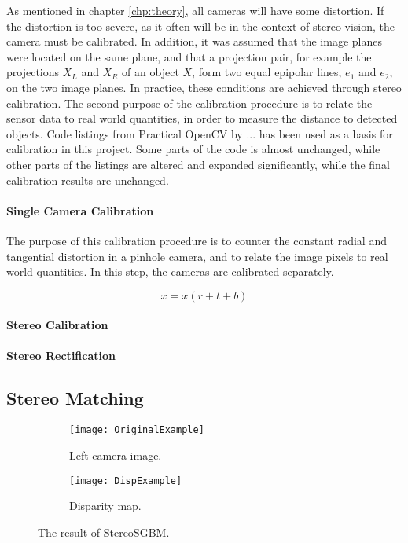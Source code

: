 As mentioned in chapter \ref{chp:theory}, all cameras will have some distortion. If the distortion is too severe, as it often will be in the context of stereo vision, the camera must be calibrated. In addition, it was assumed that the image planes were located on the same plane, and that a projection pair, for example the projections $X_L$ and $X_R$ of an object $X$, form two equal epipolar lines, $e_1$ and $e_2$, on the two image planes. In practice, these conditions are achieved through stereo calibration. The second purpose of the calibration procedure is to relate the sensor data to real world quantities, in order to measure the distance to detected objects. Code listings from Practical OpenCV by ... \cite{mal} has been used as a basis for calibration in this project. Some parts of the code is almost unchanged, while other parts of the listings are altered and expanded significantly, while the final calibration results are unchanged.


\paragraph{Single Camera Calibration}

The purpose of this calibration procedure is to counter the constant radial and tangential distortion in a pinhole camera, and to relate the image pixels to real world quantities. In this step, the cameras are calibrated separately. 



\begin{equation}
	x = x(r + t + b)
\end{equation}

\paragraph{Stereo Calibration}

\paragraph{Stereo Rectification}


\subsection{Stereo Matching}

\begin{figure}
\centering
 \begin{subfigure}[b]{0.45\textwidth}
        \texttt{[image: OriginalExample]}
        \caption{Left camera image.}
        \label{fig:OriginalExample}
    \end{subfigure}
    \begin{subfigure}[b]{0.45\textwidth}
        \texttt{[image: DispExample]}
        \caption{Disparity map.}
        \label{fig:DispExample}
    \end{subfigure}
    \caption{\label{fig:StereoMatching}The result of StereoSGBM.}
\end{figure}

